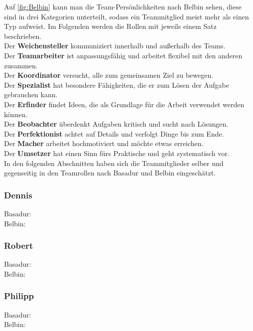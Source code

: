 \documentclass[a4paper,12pt,headsepline]{scrartcl}
\begin{document}
		Auf \cref{fig:Belbin} kann man die Team-Persönlichkeiten nach Belbin sehen, diese sind in drei Kategorien unterteilt, sodass ein Teammitglied meist mehr als einen Typ aufweist. Im Folgenden werden die Rollen mit jeweils einem Satz beschrieben.\\
		Der \textbf{Weichensteller} kommuniziert innerhalb und außerhalb des Teams.\\
		Der \textbf{Teamarbeiter} ist anpassungsfähig und arbeitet flexibel mit den anderen zusammen.\\
		Der \textbf{Koordinator} versucht, alle zum gemeinsamen Ziel zu bewegen.\\
		Der \textbf{Spezialist} hat besondere Fähigkeiten, die er zum Lösen der Aufgabe gebrauchen kann.\\
		Der \textbf{Erfinder} findet Ideen, die als Grundlage für die Arbeit verwendet werden können.\\
		Der \textbf{Beobachter} überdenkt Aufgaben kritisch und sucht nach Lösungen.\\
		Der \textbf{Perfektionist} achtet auf Details und verfolgt Dinge bis zum Ende.\\
		Der \textbf{Macher} arbeitet hochmotiviert und möchte etwas erreichen.\\
		Der \textbf{Umsetzer} hat einen Sinn fürs Praktische und geht systematisch vor.\\
		
		In den folgenden Abschnitten haben sich die Teammitglieder selber und gegenseitig in den Teamrollen nach Basadur und Belbin eingeschätzt.
		\subsubsection{Dennis}
		Basadur: \\
		Belbin: 
		\subsubsection{Robert}
		Basadur: \\
		Belbin: 
		\subsubsection{Philipp}
		Basadur: \\
		Belbin: 
\end{document}
